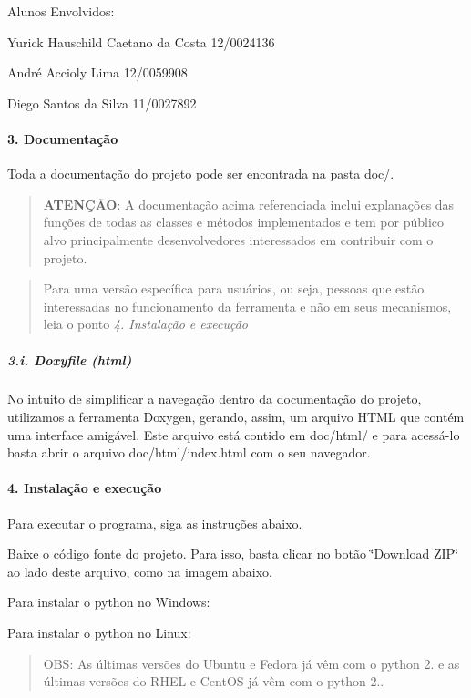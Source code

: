 Alunos Envolvidos\-:
\begin{DoxyItemize}
\item Yurick Hauschild Caetano da Costa 12/0024136
\item André Accioly Lima 12/0059908
\item Diego Santos da Silva 11/0027892
\end{DoxyItemize}

\paragraph*{3. Documentação}

Toda a documentação do projeto pode ser encontrada na pasta doc/.

\begin{quotation}
{\bfseries A\-T\-E\-NÇÃ\-O}\-: A documentação acima referenciada inclui explanações das funções de todas as classes e métodos implementados e tem por público alvo principalmente desenvolvedores interessados em contribuir com o projeto.

\end{quotation}


\begin{quotation}
Para uma versão específica para usuários, ou seja, pessoas que estão interessadas no funcionamento da ferramenta e não em seus mecanismos, leia o ponto {\itshape 4. Instalação e execução}

\end{quotation}


\subparagraph*{3.\-i. Doxyfile (html)}

No intuito de simplificar a navegação dentro da documentação do projeto, utilizamos a ferramenta Doxygen, gerando, assim, um arquivo H\-T\-M\-L que contém uma interface amigável. Este arquivo está contido em doc/html/ e para acessá-\/lo basta abrir o arquivo doc/html/index.\-html com o seu navegador.

\paragraph*{4. Instalação e execução}

Para executar o programa, siga as instruções abaixo.


\begin{DoxyEnumerate}
\item Baixe o código fonte do projeto. Para isso, basta clicar no botão \char`\"{}\-Download Z\-I\-P\char`\"{} ao lado deste arquivo, como na imagem abaixo. 
\item Para instalar o python no Windows\-:
\item Para instalar o python no Linux\-: \begin{quotation}
O\-B\-S\-: As últimas versões do Ubuntu e Fedora já vêm com o python 2. e as últimas versões do R\-H\-E\-L e Cent\-O\-S já vêm com o python 2..

\end{quotation}

\end{DoxyEnumerate}

